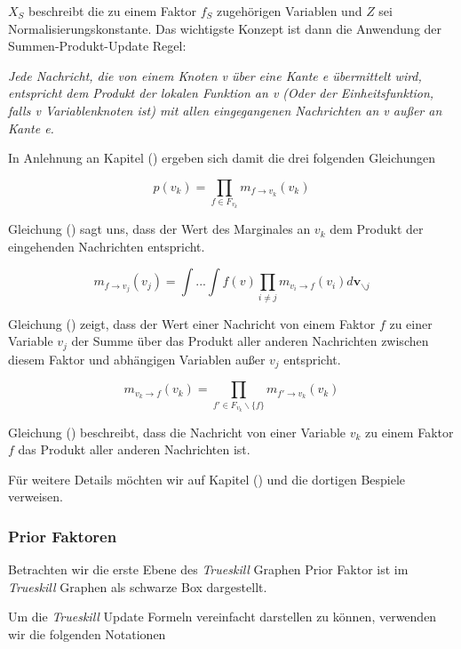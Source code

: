 \documentclass[12pt,a4paper]{scrartcl}
\numberwithin{equation}{section}
\begin{document}
 $X_S$ beschreibt die zu einem Faktor $f_S$ zugehörigen Variablen und $Z$ sei Normalisierungskonstante. 
 Das wichtigste Konzept ist dann die Anwendung der Summen-Produkt-Update Regel: 
 
 \textit{Jede Nachricht, die von einem Knoten v über eine Kante e übermittelt wird, entspricht dem Produkt der lokalen Funktion an v (Oder der Einheitsfunktion, falls v Variablenknoten
 ist) mit allen eingegangenen Nachrichten an v außer an Kante e.}
 
 In Anlehnung an Kapitel () ergeben sich damit die drei folgenden Gleichungen
 
 \begin{equation}
  p(v_k) = \prod_{f \in F_{v_k}}m_{f \rightarrow v_k}(v_k)
 \end{equation}
 
 Gleichung () sagt uns, dass der Wert des Marginales an $v_k$ dem Produkt der eingehenden Nachrichten entspricht. 
 
 \begin{equation}
  m_{f \rightarrow v_j}(v_j) = \int ... \int f(v) \prod_{i \neq j} m_{v_i \rightarrow f}(v_i) d \mathbf{v}_{\backslash j}
 \end{equation}

 Gleichung () zeigt, dass der Wert einer Nachricht von einem Faktor $f$ zu einer Variable $v_j$ der Summe über das Produkt aller anderen Nachrichten zwischen diesem Faktor
 und abhängigen Variablen außer $v_j$ entspricht. 
 
 \begin{equation}
  m_{v_k \rightarrow f}(v_k) =  \prod_{f' \in F_{v_k}\backslash \{f\} }m_{f' \rightarrow v_k}(v_k)
 \end{equation}

 Gleichung () beschreibt, dass die Nachricht von einer Variable $v_k$ zu einem Faktor $f$ das Produkt aller anderen Nachrichten ist. 
 
 Für weitere Details möchten wir auf Kapitel () und die dortigen Bespiele verweisen. 
 
 \subsubsection{Prior Faktoren}
 
 Betrachten wir die erste Ebene des \textit{Trueskill} Graphen Prior Faktor ist im \textit{Trueskill} Graphen als schwarze Box dargestellt. 
 
 
 Um die \textit{Trueskill} Update Formeln vereinfacht darstellen zu können, verwenden wir die folgenden Notationen
 
\end{document}
